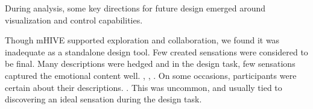 



During analysis, some key directions for future design emerged around visualization and control capabilities.

Though mHIVE supported exploration and collaboration, we found %
it was inadequate as a standalone design tool.
Few created sensations were considered to be final.
Many descriptions were hedged %
and in the design task, few sensations captured the emotional content well.%
	,
	,
	.
On some occasions, participants were certain about their descriptions.
.
This was uncommon, and usually tied to discovering an ideal sensation during the design task.


